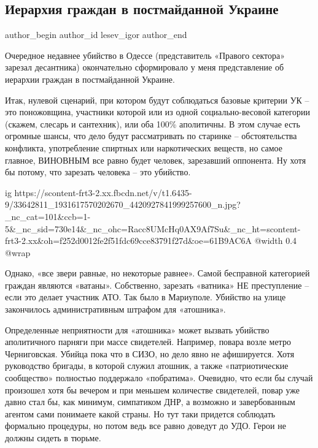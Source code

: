  
 
 
 
 
 
\subsection{Иерархия граждан в постмайданной Украине}
\label{sec:27_05_2018.fb.lesev_igor.1.ieharhia_grazhdan_ukraina}
 
\ifcmt
 author_begin
   author_id lesev_igor
 author_end
\fi

Очередное недавнее убийство в Одессе (представитель «Правого сектора» зарезал
десантника) окончательно сформировало у меня представление об иерархии граждан
в постмайданной Украине.

Итак, нулевой сценарий, при котором будут соблюдаться базовые критерии УК – это
поножовщина, участники которой или из одной социально-весовой категории
(скажем, слесарь и сантехник), или оба 100\% аполитичны. В этом случае есть
огромные шансы, что дело будут рассматривать по старинке – обстоятельства
конфликта, употребление спиртных или наркотических веществ, но самое главное,
ВИНОВНЫМ все равно будет человек, зарезавший оппонента. Ну хотя бы потому, что
зарезать человека – это убийство.

\ifcmt
  ig https://scontent-frt3-2.xx.fbcdn.net/v/t1.6435-9/33642811_1931617570202670_4420927841999257600_n.jpg?_nc_cat=101&ccb=1-5&_nc_sid=730e14&_nc_ohc=Racc8UMcHq0AX9Af7Su&_nc_ht=scontent-frt3-2.xx&oh=f252d0012fe2f51fdc69cce83791f27d&oe=61B9AC6A
  @width 0.4
  @wrap 
\fi

Однако, «все звери равные, но некоторые равнее». Самой бесправной категорией
граждан являются «ватаны». Собственно, зарезать «ватника» НЕ преступление –
если это делает участник АТО. Так было в Мариуполе. Убийство на улице
закончилось административным штрафом для «атошника».

Определенные неприятности для «атошника» может вызвать убийство аполитичного
парняги при массе свидетелей. Например, повара возле метро Черниговская. Убийца
пока что в СИЗО, но дело явно не афишируется. Хотя руководство бригады, в
которой служил атошник, а также «патриотические сообщество» полностью
поддержало «побратима». Очевидно, что если бы случай произошел хотя бы вечером
и при меньшем количестве свидетелей, повар уже давно стал бы, как минимум,
симпатиком ДНР, а возможно и завербованным агентом сами понимаете какой страны.
Но тут таки придется соблюдать формально процедуры, но потом ведь все равно
доведут до УДО. Герои не должны сидеть в тюрьме.

